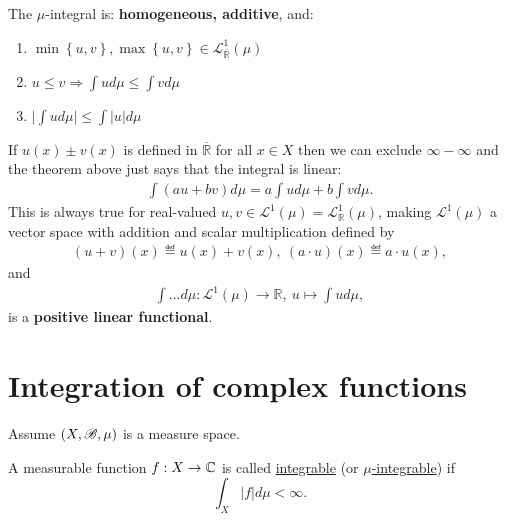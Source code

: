 \begin{theorem} The \(\mu\)-integral is: \textbf{homogeneous, additive}, and:
    \begin{enumerate}[label=(\roman*)]
        \item \(\min\left\{u,v\right\}, \max\left\{u,v\right\} \in \mathcal{L}^{1}_{\overline{\mathbb{R}}}(\mu)\) 
        \item \(u\leq v \Rightarrow \int ud\mu \leq \int vd\mu\) 
        \item \(\Big\vert \int ud\mu \Big\vert \leq \int \vert u\vert d\mu\) 
    \end{enumerate}
\end{theorem}
\begin{remark}
    If \(u(x) \pm v(x)\) is defined in \(\overline{\mathbb{R}}\) for all \(x\in X\) then we can exclude \(\infty - \infty\) and the theorem above just says that 
    the integral is linear:
    \begin{align}
        \int (au + bv)d\mu = a\int ud\mu + b\int vd\mu.
    \end{align}
    This is always true for real-valued \(u,v\in\mathcal{L}^{1}(\mu) = \mathcal{L}^{1}_{\mathbb{R}}(\mu)\), making \(\mathcal{L}^{1}(\mu)\) a vector space with 
    addition and scalar multiplication defined by
    \begin{align}
        (u + v)(x) \eqdef u(x) + v(x), \ (a\cdot u)(x) \eqdef a\cdot u(x),
    \end{align}
    and
    \begin{align}
        \int ... d\mu: \mathcal{L}^{1}(\mu) \rightarrow \mathbb{R}, \ u \mapsto \int ud\mu,
    \end{align}
    is a \textbf{positive linear functional}.
\end{remark}

\section*{Integration of complex functions}

Assume $(X,\mathscr{B},\mu)$ is a measure space. 

\begin{definition}
    A measurable function $f:X\rightarrow\mathbb{C}$ is called \underline{integrable} (or \underline{$\mu$-integrable}) if \[\int_X |f|d\mu<\infty.\]
\end{definition}


